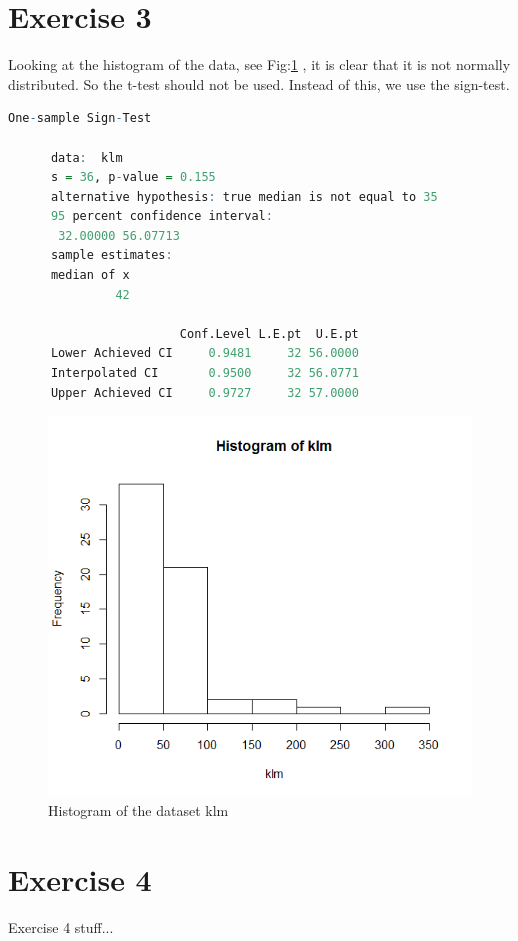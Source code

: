 \documentclass{article}
\begin{document}
  \section{Exercise 3}
    Looking at the histogram of the data, see Fig:\ref{fig:HistKLM} , it is clear that it is not normally distributed.
    So the t-test should not be used.
    Instead of this, we use the sign-test.
    \begin{lstlisting}[language=R]
        One-sample Sign-Test

      data:  klm
      s = 36, p-value = 0.155
      alternative hypothesis: true median is not equal to 35
      95 percent confidence interval:
       32.00000 56.07713
      sample estimates:
      median of x 
               42 

                        Conf.Level L.E.pt  U.E.pt
      Lower Achieved CI     0.9481     32 56.0000
      Interpolated CI       0.9500     32 56.0771
      Upper Achieved CI     0.9727     32 57.0000
    \end{lstlisting}
    

    \begin{figure}
      \includegraphics[scale=0.3]{../results/HistKLM.png}
      \caption{Histogram of the dataset klm}
      \label{fig:HistKLM}
    \end{figure}

  \section{Exercise 4}
    Exercise 4 stuff...
\end{document}
